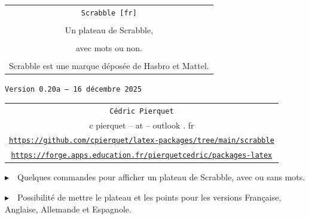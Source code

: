 \documentclass{article}
\def\TPversion{0.20a}
\def\TPdate{16 décembre 2025}
\begin{document}
\pagestyle{fancy}

\thispagestyle{empty}

\vspace{2cm}

\begin{center}
	\begin{minipage}{0.75\linewidth}
	\begin{tcolorbox}[colframe=yellow,colback=yellow!15]
		\begin{center}
			\begin{tabular}{c}
				{\Huge \texttt{Scrabble [fr]}}\\
				\\
				{\LARGE Un plateau de Scrabble,} \\
				\\
				{\LARGE avec mots ou non.} \\
				\\
				{Scrabble\texttrademark{} est une marque déposée de Hasbro\texttrademark{} et Mattel\texttrademark{}.}
			\end{tabular}
			
			\medskip
			
			{\small \texttt{Version \TPversion{} -- \TPdate}}
		\end{center}
	\end{tcolorbox}
\end{minipage}
\end{center}

\vspace{0.5cm}

\begin{center}
	\begin{tabular}{c}
	\texttt{Cédric Pierquet}\\
	{\ttfamily c pierquet -- at -- outlook . fr}\\
	\texttt{\url{https://github.com/cpierquet/latex-packages/tree/main/scrabble}}\\
	\texttt{\url{https://forge.apps.education.fr/pierquetcedric/packages-latex}}
\end{tabular}
\end{center}

\vspace{0.5cm}

{$\blacktriangleright$~~Quelques commandes pour afficher un plateau de Scrabble, avec ou sans mots.}

\smallskip

{$\blacktriangleright$~~Possibilité de mettre le plateau et les points pour les versions Française, Anglaise, Allemande et Espagnole.}
\end{document}
